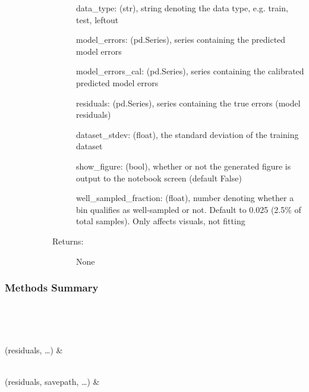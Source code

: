 \documentclass[letterpaper,10pt,english]{sphinxmanual}
\begin{document}
\begin{fulllineitems}
\begin{description}
\begin{description}
\begin{description}
data\_type: (str), string denoting the data type, e.g. train, test, leftout

model\_errors: (pd.Series), series containing the predicted model errors

model\_errors\_cal: (pd.Series), series containing the calibrated predicted model errors

residuals: (pd.Series), series containing the true errors (model residuals)

dataset\_stdev: (float), the standard deviation of the training dataset

show\_figure: (bool), whether or not the generated figure is output to the notebook screen (default False)

well\_sampled\_fraction: (float), number denoting whether a bin qualifies as well-sampled or not. Default to 0.025 (2.5\% of total samples). Only affects visuals, not fitting

\item[{Returns:}] \leavevmode
None

\end{description}

\end{description}

\end{description}
\subsubsection*{Methods Summary}


\begin{savenotes}\sphinxatlongtablestart\begin{longtable}[c]{}
\hline

\endfirsthead

%
{}\\
\hline

\endhead

\hline
{}\\
\endfoot

\endlastfoot

{\hyperref[\detokenize{api/mastml.plots.Error:mastml.plots.Error.plot_cumulative_normalized_error}]{}}(residuals, …)
&

\\
\hline
{\hyperref[\detokenize{api/mastml.plots.Error:mastml.plots.Error.plot_normalized_error}]{}}(residuals, savepath, …)
&


\end{longtable}
\end{savenotes}
\end{fulllineitems}
\end{document}
